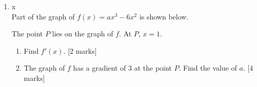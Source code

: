 \documentclass[12pt, twoside]{article}
\begin{document}
\begin{enumerate}
  \item x\\
  Part of the graph of $f(x)= ax^3-6x^2$ is shown below.
    \begin{center}
    \end{center}

    The point $P$ lies on the graph of $f$. At $P$, $x=1$.
    \begin{enumerate}
      \item Find $f'(x)$. [2 marks]
      \item The graph of $f$ has a gradient of 3 at the point $P$. Find the value of $a$. [4 marks]
    \end{enumerate}

\end{enumerate}
\end{document}
